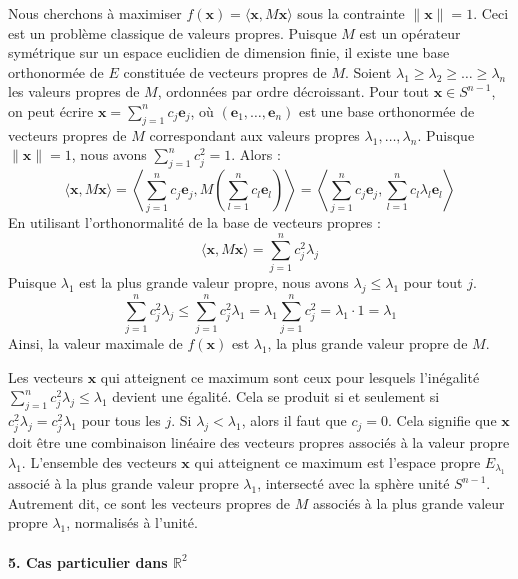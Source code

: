 \documentclass[11pt,a4paper]{report}
\begin{document}
Nous cherchons à maximiser
\(f(\mathbf{x}) = \langle \mathbf{x}, M\mathbf{x} \rangle\) sous la
contrainte \(\|\mathbf{x}\|=1\). Ceci est un problème classique de
valeurs propres. Puisque \(M\) est un opérateur symétrique sur un espace
euclidien de dimension finie, il existe une base orthonormée de \(E\)
constituée de vecteurs propres de \(M\). Soient
\(\lambda_1 \ge \lambda_2 \ge \dots \ge \lambda_n\) les valeurs propres
de \(M\), ordonnées par ordre décroissant. Pour tout
\(\mathbf{x} \in S^{n-1}\), on peut écrire
\(\mathbf{x} = \sum_{j=1}^n c_j \mathbf{e}_j\), où
\((\mathbf{e}_1, \dots, \mathbf{e}_n)\) est une base orthonormée de
vecteurs propres de \(M\) correspondant aux valeurs propres
\(\lambda_1, \dots, \lambda_n\). Puisque \(\|\mathbf{x}\|=1\), nous
avons \(\sum_{j=1}^n c_j^2 = 1\). Alors :
\[ \langle \mathbf{x}, M\mathbf{x} \rangle = \left\langle \sum_{j=1}^n c_j \mathbf{e}_j, M \left( \sum_{l=1}^n c_l \mathbf{e}_l \right) \right\rangle = \left\langle \sum_{j=1}^n c_j \mathbf{e}_j, \sum_{l=1}^n c_l \lambda_l \mathbf{e}_l \right\rangle \]
En utilisant l'orthonormalité de la base de vecteurs propres :
\[ \langle \mathbf{x}, M\mathbf{x} \rangle = \sum_{j=1}^n c_j^2 \lambda_j \]
Puisque \(\lambda_1\) est la plus grande valeur propre, nous avons
\(\lambda_j \le \lambda_1\) pour tout \(j\).
\[ \sum_{j=1}^n c_j^2 \lambda_j \le \sum_{j=1}^n c_j^2 \lambda_1 = \lambda_1 \sum_{j=1}^n c_j^2 = \lambda_1 \cdot 1 = \lambda_1 \]
Ainsi, la valeur maximale de \(f(\mathbf{x})\) est \(\lambda_1\), la
plus grande valeur propre de \(M\).

Les vecteurs \(\mathbf{x}\) qui atteignent ce maximum sont ceux pour
lesquels l'inégalité \(\sum_{j=1}^n c_j^2 \lambda_j \le \lambda_1\)
devient une égalité. Cela se produit si et seulement si
\(c_j^2 \lambda_j = c_j^2 \lambda_1\) pour tous les \(j\). Si
\(\lambda_j < \lambda_1\), alors il faut que \(c_j=0\). Cela signifie
que \(\mathbf{x}\) doit être une combinaison linéaire des vecteurs
propres associés à la valeur propre \(\lambda_1\). L'ensemble des
vecteurs \(\mathbf{x}\) qui atteignent ce maximum est l'espace propre
\(E_{\lambda_1}\) associé à la plus grande valeur propre \(\lambda_1\),
intersecté avec la sphère unité \(S^{n-1}\). Autrement dit, ce sont les
vecteurs propres de \(M\) associés à la plus grande valeur propre
\(\lambda_1\), normalisés à l'unité.

\hypertarget{cas-particulier-dans-mathbbr2}{%
\paragraph{\texorpdfstring{5. Cas particulier dans
\(\mathbb{R}^2\)}{5. Cas particulier dans \textbackslash mathbb\{R\}\^{}2}}\label{cas-particulier-dans-mathbbr2}}
\end{document}
